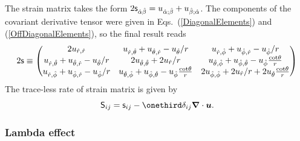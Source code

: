 \documentclass[\mydriver,12pt,twoside,notitlepage,a4paper]{article}
\renewcommand{\vec}[1]{\mbox{\boldmath{$#1$}}}
\newcommand{\uv}            {\vec{u}}
\newcommand{\nab}{\mbox{\boldmath $\nabla$} {}}
\begin{document}
The strain matrix takes the form
$2{\sf s}_{\hat\alpha\hat\beta}=
u_{\hat\alpha;\hat\beta}+u_{\hat\beta;\hat\alpha}$.
The components of the covariant derivative tensor were given in
Eqs.~(\ref{DiagonalElements}) and (\ref{OffDiagonalElements}),
so the final result reads
\begin{equation}
2{\sf s}
\equiv
\begin{pmatrix}
2u_{\hat r,\hat r}&
  u_{\hat r,\hat\theta}+u_{\hat\theta,\hat r}-u_{\hat\theta}/r&
    u_{\hat r,\hat\phi}+u_{\hat\phi,\hat r}-u_{\hat\phi}/r\cr
u_{\hat r,\hat\theta}+u_{\hat\theta,\hat r}-u_{\hat\theta}/r&
  2u_{\hat\theta,\hat\theta}+2u_{\hat r}/r&
    u_{\hat\theta,\hat\phi}+u_{\hat\phi,\hat\theta}-
                              u_{\hat\phi}\frac{\cot\!\theta}{r}\cr
u_{\hat r,\hat\phi}+u_{\hat\phi,\hat r}-u_{\hat\phi}/r&
  u_{\hat\theta,\hat\phi}+u_{\hat\phi,\hat\theta}-
                              u_{\hat\phi}\frac{\cot\!\theta}{r}&
    2u_{\hat\phi,\hat\phi}+2u_{\hat r}/r+
                               2u_{\hat\theta}\frac{\cot\!\theta}{r}
\end{pmatrix}
\end{equation}
The trace-less rate of strain matrix is given by
\begin{equation}
{\sf S}_{ij}={\sf s}_{ij}-\onethird\delta_{ij}\nab\cdot\uv.
\end{equation}

\subsubsection{Lambda effect}
\end{document}
